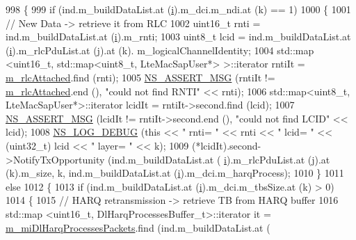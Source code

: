 \begin{DoxyCode}
998             \{
999               \textcolor{keywordflow}{if} (ind.m\_buildDataList.at (\hyperlink{bernuolliDistribution_8m_a6f6ccfcf58b31cb6412107d9d5281426}{i}).m\_dci.m\_ndi.at (k) == 1)
1000                 \{
1001                   \textcolor{comment}{// New Data -> retrieve it from RLC}
1002                   uint16\_t rnti = ind.m\_buildDataList.at (\hyperlink{bernuolliDistribution_8m_a6f6ccfcf58b31cb6412107d9d5281426}{i}).m\_rnti;
1003                   uint8\_t lcid = ind.m\_buildDataList.at (\hyperlink{bernuolliDistribution_8m_a6f6ccfcf58b31cb6412107d9d5281426}{i}).m\_rlcPduList.at (j).at (k).
      m\_logicalChannelIdentity;
1004                   std::map <uint16\_t, std::map<uint8\_t, LteMacSapUser*> >::iterator rntiIt = 
      \hyperlink{classns3_1_1LteEnbMac_a5de3f3cae1cbc8438a7fdc5cd173a821}{m\_rlcAttached}.find (rnti);
1005                   \hyperlink{assert_8h_aff5ece9066c74e681e74999856f08539}{NS\_ASSERT\_MSG} (rntiIt != \hyperlink{classns3_1_1LteEnbMac_a5de3f3cae1cbc8438a7fdc5cd173a821}{m\_rlcAttached}.end (), \textcolor{stringliteral}{"could not find
       RNTI"} << rnti);
1006                   std::map<uint8\_t, LteMacSapUser*>::iterator lcidIt = rntiIt->second.find (lcid);
1007                   \hyperlink{assert_8h_aff5ece9066c74e681e74999856f08539}{NS\_ASSERT\_MSG} (lcidIt != rntiIt->second.end (), \textcolor{stringliteral}{"could not find LCID"} << 
      lcid);
1008                   \hyperlink{group__logging_ga413f1886406d49f59a6a0a89b77b4d0a}{NS\_LOG\_DEBUG} (\textcolor{keyword}{this} << \textcolor{stringliteral}{" rnti= "} << rnti << \textcolor{stringliteral}{" lcid= "} << (uint32\_t) lcid << \textcolor{stringliteral}{"
       layer= "} << k);
1009                   (*lcidIt).second->NotifyTxOpportunity (ind.m\_buildDataList.at (
      \hyperlink{bernuolliDistribution_8m_a6f6ccfcf58b31cb6412107d9d5281426}{i}).m\_rlcPduList.at (j).at (k).m\_size, k, ind.m\_buildDataList.at (\hyperlink{bernuolliDistribution_8m_a6f6ccfcf58b31cb6412107d9d5281426}{i}).m\_dci.m\_harqProcess);
1010                 \}
1011               \textcolor{keywordflow}{else}
1012                 \{
1013                   \textcolor{keywordflow}{if} (ind.m\_buildDataList.at (\hyperlink{bernuolliDistribution_8m_a6f6ccfcf58b31cb6412107d9d5281426}{i}).m\_dci.m\_tbsSize.at (k) > 0)
1014                     \{
1015                       \textcolor{comment}{// HARQ retransmission -> retrieve TB from HARQ buffer}
1016                       std::map <uint16\_t, DlHarqProcessesBuffer\_t>::iterator it = 
      \hyperlink{classns3_1_1LteEnbMac_aaf60e2fb6f8326eeebbdec6b7e7054da}{m\_miDlHarqProcessesPackets}.find (ind.m\_buildDataList.at (

\end{DoxyCode}

